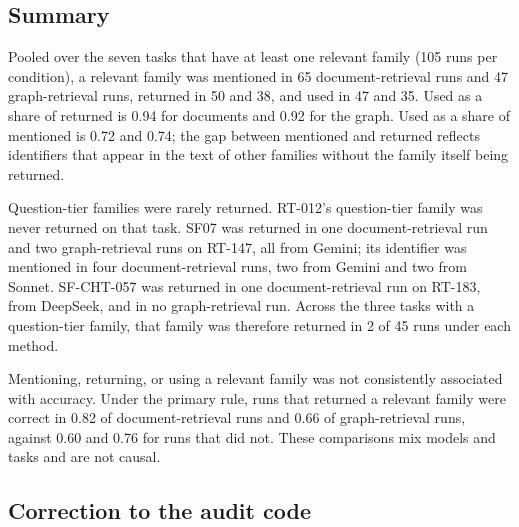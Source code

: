 \documentclass[11pt]{article}
\begin{document}
\subsection*{Summary}

Pooled over the seven tasks that have at least one relevant family (105 runs per condition), a relevant family was mentioned in 65 document-retrieval runs and 47 graph-retrieval runs, returned in 50 and 38, and used in 47 and 35. Used as a share of returned is 0.94 for documents and 0.92 for the graph. Used as a share of mentioned is 0.72 and 0.74; the gap between mentioned and returned reflects identifiers that appear in the text of other families without the family itself being returned.

Question-tier families were rarely returned. RT-012's question-tier family was never returned on that task. SF07 was returned in one document-retrieval run and two graph-retrieval runs on RT-147, all from Gemini; its identifier was mentioned in four document-retrieval runs, two from Gemini and two from Sonnet. SF-CHT-057 was returned in one document-retrieval run on RT-183, from DeepSeek, and in no graph-retrieval run. Across the three tasks with a question-tier family, that family was therefore returned in 2 of 45 runs under each method.

Mentioning, returning, or using a relevant family was not consistently associated with accuracy. Under the primary rule, runs that returned a relevant family were correct in 0.82 of document-retrieval runs and 0.66 of graph-retrieval runs, against 0.60 and 0.76 for runs that did not. These comparisons mix models and tasks and are not causal.

\subsection*{Correction to the audit code}
\end{document}
